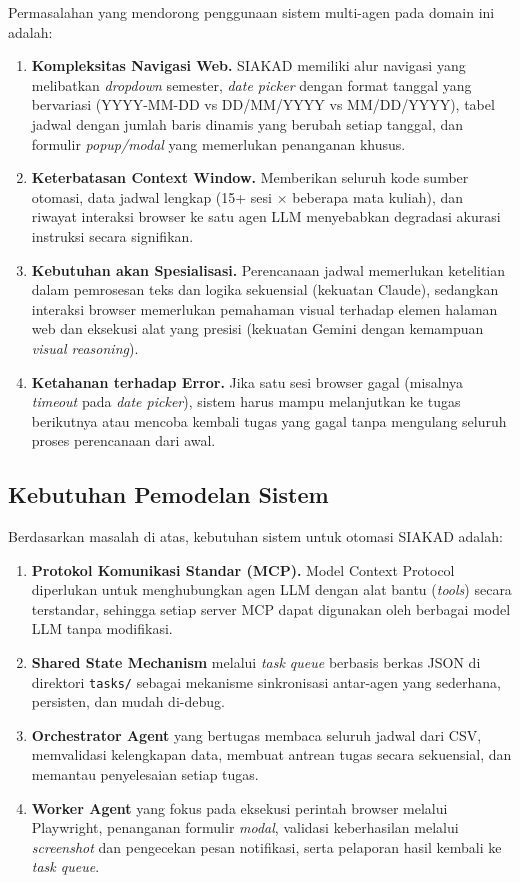 Permasalahan yang mendorong penggunaan sistem multi-agen pada domain ini adalah:
\begin{enumerate}
  \item \textbf{Kompleksitas Navigasi Web.} SIAKAD memiliki alur navigasi yang melibatkan \textit{dropdown} semester, \textit{date picker} dengan format tanggal yang bervariasi (YYYY-MM-DD vs DD/MM/YYYY vs MM/DD/YYYY), tabel jadwal dengan jumlah baris dinamis yang berubah setiap tanggal, dan formulir \textit{popup/modal} yang memerlukan penanganan khusus.
  \item \textbf{Keterbatasan Context Window.} Memberikan seluruh kode sumber otomasi, data jadwal lengkap (15+ sesi $\times$ beberapa mata kuliah), dan riwayat interaksi browser ke satu agen LLM menyebabkan degradasi akurasi instruksi secara signifikan.
  \item \textbf{Kebutuhan akan Spesialisasi.} Perencanaan jadwal memerlukan ketelitian dalam pemrosesan teks dan logika sekuensial (kekuatan Claude), sedangkan interaksi browser memerlukan pemahaman visual terhadap elemen halaman web dan eksekusi alat yang presisi (kekuatan Gemini dengan kemampuan \textit{visual reasoning}).
  \item \textbf{Ketahanan terhadap Error.} Jika satu sesi browser gagal (misalnya \textit{timeout} pada \textit{date picker}), sistem harus mampu melanjutkan ke tugas berikutnya atau mencoba kembali tugas yang gagal tanpa mengulang seluruh proses perencanaan dari awal.
\end{enumerate}

\subsection{Kebutuhan Pemodelan Sistem}

Berdasarkan masalah di atas, kebutuhan sistem untuk otomasi SIAKAD adalah:
\begin{enumerate}
  \item \textbf{Protokol Komunikasi Standar (MCP).} Model Context Protocol diperlukan untuk menghubungkan agen LLM dengan alat bantu (\textit{tools}) secara terstandar, sehingga setiap server MCP dapat digunakan oleh berbagai model LLM tanpa modifikasi.
  \item \textbf{Shared State Mechanism} melalui \textit{task queue} berbasis berkas JSON di direktori \texttt{tasks/} sebagai mekanisme sinkronisasi antar-agen yang sederhana, persisten, dan mudah di-debug.
  \item \textbf{Orchestrator Agent} yang bertugas membaca seluruh jadwal dari CSV, memvalidasi kelengkapan data, membuat antrean tugas secara sekuensial, dan memantau penyelesaian setiap tugas.
  \item \textbf{Worker Agent} yang fokus pada eksekusi perintah browser melalui Playwright, penanganan formulir \textit{modal}, validasi keberhasilan melalui \textit{screenshot} dan pengecekan pesan notifikasi, serta pelaporan hasil kembali ke \textit{task queue}.
\end{enumerate}


